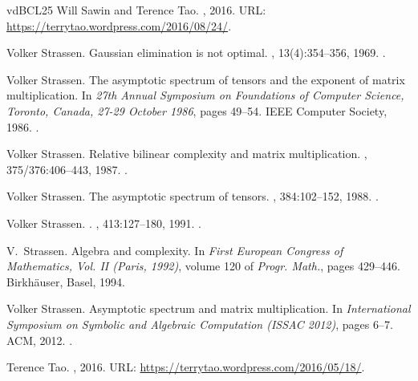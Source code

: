 \documentclass[11pt,letterpaper]{article}
\begin{document}
\begin{thebibliography}{vdBCL{\etalchar{+}}25}
Will Sawin and Terence Tao.
, 2016.
\newblock URL: \url{https://terrytao.wordpress.com/2016/08/24/}.

Volker Strassen.
\newblock Gaussian elimination is not optimal.
, 13(4):354--356, 1969.
\newblock \href {https://doi.org/10.1007/BF02165411}
  {}.

Volker Strassen.
\newblock The asymptotic spectrum of tensors and the exponent of matrix
  multiplication.
\newblock In {\em 27th Annual Symposium on Foundations of Computer Science,
  Toronto, Canada, 27-29 October 1986}, pages 49--54. {IEEE} Computer Society,
  1986.
\newblock \href {https://doi.org/10.1109/SFCS.1986.52}
  {}.

Volker Strassen.
\newblock Relative bilinear complexity and matrix multiplication.
, 375/376:406--443, 1987.
\newblock \href {https://doi.org/10.1515/crll.1987.375-376.406}
  {}.

Volker Strassen.
\newblock The asymptotic spectrum of tensors.
, 384:102--152, 1988.
\newblock \href {https://doi.org/10.1515/crll.1988.384.102}
  {}.

Volker Strassen.
.
, 413:127–180, 1991.
\newblock \href {https://doi.org/10.1515/crll.1991.413.127}
  {}.

V.~Strassen.
\newblock Algebra and complexity.
\newblock In {\em First {E}uropean {C}ongress of {M}athematics, {V}ol. {II}
  ({P}aris, 1992)}, volume 120 of {\em Progr. Math.}, pages 429--446.
  Birkh\"{a}user, Basel, 1994.

Volker Strassen.
\newblock Asymptotic spectrum and matrix multiplication.
\newblock In {\em International Symposium on Symbolic and Algebraic Computation
  (ISSAC 2012)}, pages 6--7. {ACM}, 2012.
\newblock \href {https://doi.org/10.1145/2442829.2442832}
  {}.

Terence Tao.
, 2016.
\newblock URL: \url{https://terrytao.wordpress.com/2016/05/18/}.


\end{thebibliography}
\end{document}
